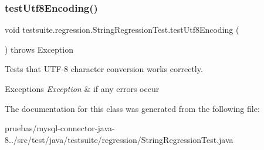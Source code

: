 \subsubsection{\texorpdfstring{test\+Utf8\+Encoding()}{testUtf8Encoding()}}
{\footnotesize\ttfamily void testsuite.\+regression.\+String\+Regression\+Test.\+test\+Utf8\+Encoding (\begin{DoxyParamCaption}{ }\end{DoxyParamCaption}) throws Exception}

Tests that U\+T\+F-\/8 character conversion works correctly.


\begin{DoxyExceptions}{Exceptions}
{\em Exception} & if any errors occur \\
\hline
\end{DoxyExceptions}


The documentation for this class was generated from the following file\+:\begin{DoxyCompactItemize}
\item 
pruebas/mysql-\/connector-\/java-\/8../src/test/java/testsuite/regression/String\+Regression\+Test.\+java\end{DoxyCompactItemize}
